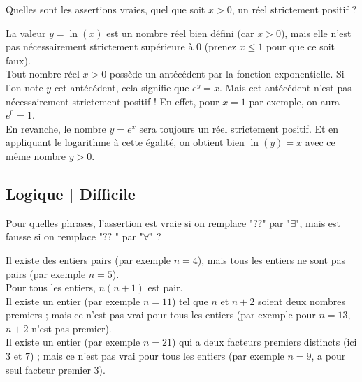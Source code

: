\begin{question}
Quelles sont les assertions vraies, quel que soit $x>0$, un réel strictement positif ?
\begin{answers} 
\end{answers}
\begin{explanations} 
La valeur $y=\ln(x)$ est un nombre réel bien défini (car $x>0$), mais elle n'est pas nécessairement strictement supérieure à $0$ (prenez $x\leq 1$ pour que ce soit faux).\\
Tout nombre réel $x>0$ possède un antécédent par la fonction exponentielle. Si l'on note $y$ cet antécédent, cela signifie que $e^y = x$. Mais cet antécédent n'est pas nécessairement strictement positif ! En effet, pour $x=1$ par exemple, on aura $e^0 = 1$.\\
En revanche, le nombre $y=e^x$ sera toujours un réel strictement positif. Et en appliquant le logarithme à cette égalité, on obtient bien $\ln(y) = x$ avec ce même nombre $y>0$.
\end{explanations}
\end{question}


\subsection{Logique | Difficile}


\begin{question}
Pour quelles phrases, l'assertion est vraie si on remplace "$??$" par "$\exists$", mais est fausse si on remplace "$??$ " par "$\forall$" ?
\begin{answers} 
\end{answers}
\begin{explanations} 
Il existe des entiers pairs (par exemple $n=4$), mais tous les entiers ne sont pas pairs (par exemple $n=5$).\\
Pour tous les entiers, $n(n+1)$ est pair.\\
Il existe un entier (par exemple $n=11$) tel que $n$ et $n+2$ soient deux nombres premiers ; mais ce n'est pas vrai pour tous les entiers (par exemple pour $n=13$, $n+2$ n'est pas premier). \\
Il existe un entier (par exemple $n=21$) qui a deux facteurs premiers distincts (ici $3$ et $7$) ; mais ce n'est pas vrai pour tous les entiers (par exemple $n=9$, a pour seul facteur premier $3$). 
\end{explanations}
\end{question}


